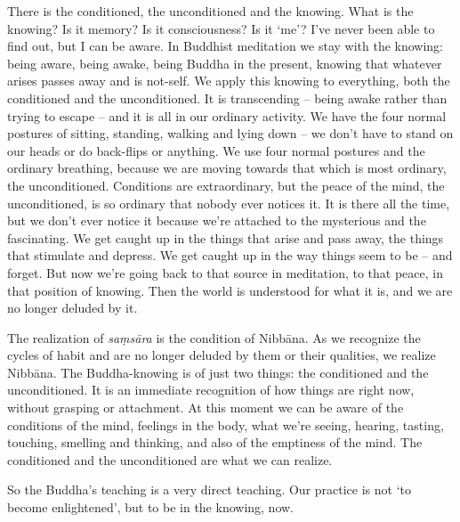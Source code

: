 There is the conditioned, the unconditioned and the knowing. What is the knowing? Is it memory? Is it consciousness? Is it `me'? I've never been able to find out, but I can be aware. In Buddhist meditation we stay with the knowing: being aware, being awake, being Buddha in the present, knowing that whatever arises passes away and is not-self. We apply this knowing to everything, both the conditioned and the unconditioned. It is transcending -- being awake rather than trying to escape -- and it is all in our ordinary activity. We have the four normal postures of sitting, standing, walking and lying down -- we don't have to stand on our heads or do back-flips or anything. We use four normal postures and the ordinary breathing, because we are moving towards that which is most ordinary, the unconditioned. Conditions are extraordinary, but the peace of the mind, the unconditioned, is so ordinary that nobody ever notices it. It is there all the time, but we don't ever notice it because we're attached to the mysterious and the fascinating. We get caught up in the things that arise and pass away, the things that stimulate and depress. We get caught up in the way things seem to be -- and forget. But now we're going back to that source in meditation, to that peace, in that position of knowing. Then the world is understood for what it is, and we are no longer deluded by it.

The realization of \textit{sa\d{m}s\=ara} is the condition of Nibb\=ana. As we recognize the cycles of habit and are no longer deluded by them or their qualities, we realize Nibb\=ana. The Buddha-knowing is of just two things: the conditioned and the unconditioned. It is an immediate recognition of how things are right now, without grasping or attachment. At this moment we can be aware of the conditions of the mind, feelings in the body, what we're seeing, hearing, tasting, touching, smelling and thinking, and also of the emptiness of the mind. The conditioned and the unconditioned are what we can realize.

So the Buddha's teaching is a very direct teaching. Our practice is not `to become enlightened', but to be in the knowing, now.

